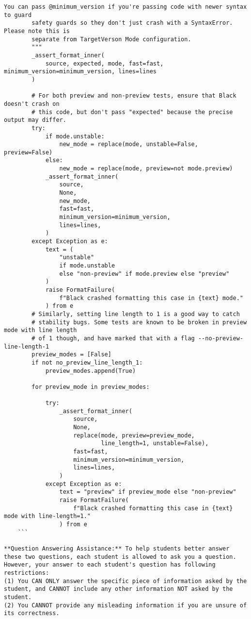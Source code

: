 \begin{Verbatim}[fontsize=\small, breaklines=true, breakanywhere=true]
        You can pass @minimum_version if you're passing code with newer syntax to guard
        safety guards so they don't just crash with a SyntaxError. Please note this is
        separate from TargetVerson Mode configuration.
        """
        _assert_format_inner(
            source, expected, mode, fast=fast, minimum_version=minimum_version, lines=lines
        )

        # For both preview and non-preview tests, ensure that Black doesn't crash on
        # this code, but don't pass "expected" because the precise output may differ.
        try:
            if mode.unstable:
                new_mode = replace(mode, unstable=False, preview=False)
            else:
                new_mode = replace(mode, preview=not mode.preview)
            _assert_format_inner(
                source,
                None,
                new_mode,
                fast=fast,
                minimum_version=minimum_version,
                lines=lines,
            )
        except Exception as e:
            text = (
                "unstable"
                if mode.unstable
                else "non-preview" if mode.preview else "preview"
            )
            raise FormatFailure(
                f"Black crashed formatting this case in {text} mode."
            ) from e
        # Similarly, setting line length to 1 is a good way to catch
        # stability bugs. Some tests are known to be broken in preview mode with line length
        # of 1 though, and have marked that with a flag --no-preview-line-length-1
        preview_modes = [False]
        if not no_preview_line_length_1:
            preview_modes.append(True)

        for preview_mode in preview_modes:

            try:
                _assert_format_inner(
                    source,
                    None,
                    replace(mode, preview=preview_mode,
                            line_length=1, unstable=False),
                    fast=fast,
                    minimum_version=minimum_version,
                    lines=lines,
                )
            except Exception as e:
                text = "preview" if preview_mode else "non-preview"
                raise FormatFailure(
                    f"Black crashed formatting this case in {text} mode with line-length=1."
                ) from e
    ```
    
**Question Answering Assistance:** To help students better answer these two questions, each student is allowed to ask you a question. However, your answer to each student's question has following restrictions:
(1) You CAN ONLY answer the specific piece of information asked by the student, and CANNOT include any other information NOT asked by the student.
(2) You CANNOT provide any misleading information if you are unsure of its correctness.


\end{Verbatim}
